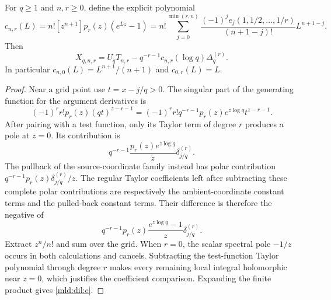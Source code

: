 \begin{theorem}
\label{mld:dil:scale-thm}
For $q\ge1$ and $n,r\ge0$, define the explicit polynomial
\begin{equation}
 c_{n,r}(L)=n![z^{n+1}]p_r(z)(e^{Lz}-1)
 =n!\sum_{j=0}^{\min(r,n)}
       \frac{(-1)^j e_j(1,1/2,\ldots,1/r)}{(n+1-j)!}
       L^{n+1-j}.
 \label{mld:dil:c}
\end{equation}
Then
\begin{equation}
 \boxed{X_{q,n,r}=U_qT_{n,r}
       -q^{-r-1}c_{n,r}(\log q)\Delta_q^{(r)}.}
 \label{mld:dil:scale-law}
\end{equation}
In particular $c_{n,0}(L)=L^{n+1}/(n+1)$ and $c_{0,r}(L)=L$.
\end{theorem}

\begin{proof}
Near a grid point use $t=x-j/q>0$.  The singular part of the generating
function for the argument derivatives is
\[
 (-1)^r r!p_r(z)(qt)^{z-r-1}
 =(-1)^r r!q^{-r-1}p_r(z)e^{z\log q}t^{z-r-1}.
\]
After pairing with a test function, only its Taylor term of degree $r$
produces a pole at $z=0$.  Its contribution is
\[
 q^{-r-1}\frac{p_r(z)e^{z\log q}}z\delta_{j/q}^{(r)}.
\]
The pullback of the source-coordinate family instead has polar
contribution $q^{-r-1}p_r(z)\delta_{j/q}^{(r)}/z$.
The regular Taylor coefficients left after subtracting these complete
polar contributions are respectively the ambient-coordinate constant
terms and the pulled-back constant terms.  Their difference is therefore
the negative of
\[
 q^{-r-1}p_r(z)\frac{e^{z\log q}-1}{z}\delta_{j/q}^{(r)}.
\]
Extract $z^n/n!$ and sum over the grid.  When $r=0$, the scalar spectral
pole $-1/z$ occurs in both calculations and cancels.  Subtracting the
test-function Taylor polynomial through degree $r$ makes every
remaining local integral holomorphic near $z=0$, which justifies the
coefficient comparison.  Expanding the finite product gives
\eqref{mld:dil:c}.
\end{proof}

